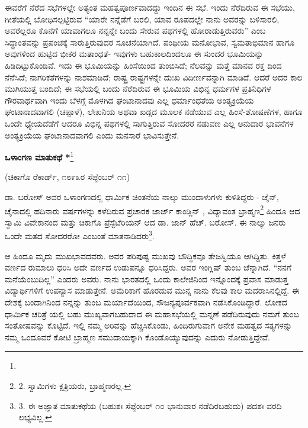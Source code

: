 ಈವರೆಗೆ ನೆರೆದ ಸಭೆಗಳಲ್ಲೇ ಅತ್ಯಂತ ಮಹತ್ವಪೂರ್ಣವಾದದ್ದು ಇಂದಿನ ಈ ಸಭೆ. ಇಂದು ನೆರೆದಿರುವ ಈ ಸಭೆಯು, ಗೀತೆಯಲ್ಲಿ ಬೋಧಿಸಲ್ಪಟ್ಟಿರುವ “ಯಾರೇ ನನ್ನೆಡೆಗೆ ಬರಲಿ, ಯಾವ ರೂಪದಲ್ಲೇ ನಾನು ಅವರನ್ನು ಬಳಿಸಾರಲಿ, ಅವರೆಲ್ಲರೂ ಕೊನೆಗೆ ಯಾವಾಗಲೂ ನನ್ನನ್ನೇ ಬಂದು ಸೇರುವ ಪಥಗಳಲ್ಲಿ ಹೋರಾಡುತ್ತಿರುವರು” ಎಂಬ ಸಿದ್ಧಾಂತವನ್ನು ಪ್ರಪಂಚಕ್ಕೆ ಸಾರುತ್ತಿರುವುದರ ಸೂಚನೆಯಾಗಿದೆ. ಪಂಥೀಯ ಮನೋಭಾವ, ಸ್ವಮತಾಭಿಮಾನ ಹಾಗೂ ಅವುಗಳಿಂದ ಹುಟ್ಟಿದ ಭೀಕರ ಮತಾಂಧತೆ- ಇವುಗಳು ಬಹುಕಾಲದಿಂದಲೂ ಈ ಸುಂದರ ಭೂಮಿಯನ್ನು ಹಿಡಿದಿಟ್ಟುಕೊಂಡಿವೆ. ಇದು ಈ ಭೂಮಿಯನ್ನು ಹಿಂಸೆಯಿಂದ ತುಂಬಿಸಿದೆ; ನೆಲವನ್ನು ಮತ್ತೆ ಮಾನವ ರಕ್ತ ದಿಂದ ನೆನೆಸಿದೆ; ನಾಗರಿಕತೆಗಳನ್ನು ನಾಶಮಾಡಿದೆ; ರಾಷ್ಟ್ರ ರಾಷ್ಟ್ರಗಳನ್ನೇ ದುಃಖ ವಿದೀರ್ಣವನ್ನಾಗಿ ಮಾಡಿದೆ. ಆದರೆ ಅದರ ಕಾಲ ಮುಗಿಯುತ್ತ ಬಂದಿದೆ; ಈ ಸಭೆಯಲ್ಲಿ ಬಂದು ನೆರೆದಿರುವ ಈ ಭೂಮಿಯ ವಿಭಿನ್ನ ಧರ್ಮಗಳ ಪ್ರತಿನಿಧಿಗಳ ಗೌರವಾರ್ಥವಾಗಿ ಇಂದು ಬೆಳಗ್ಗೆ ಮೊಳಗಿದ ಘಂಟಾನಾದವು ಎಲ್ಲ ಧರ್ಮಾಂಧತೆಯ ಅಂತ್ಯಕ್ರಿಯೆಯ ಘಂಟಾನಾದವಾಗಲಿ (ಚಪ್ಪಾಳೆ), ಲೇಖನಿಯ ಅಥವಾ ಖಡ್ಗದ ಮೂಲಕ ನಡೆಯುವ ಎಲ್ಲ ಹಿಂಸೆ-ಶೋಷಣೆಗಳ, ಹಾಗೂ ಒಂದೇ ಧ್ಯೇಯದೆಡೆಗೆ ಆದರೂ ವಿಭಿನ್ನ ಪಥಗಳಲ್ಲಿ ಸಾಗುತ್ತಿರುವ ಸೋದರರ ನಡುವಣ ಎಲ್ಲ ಅನುದಾರ ಭಾವನೆಗಳ ಅಂತ್ಯಕ್ರಿಯೆಯ ಘಂಟಾನಾದವಾಗಲಿ ಎಂದು ಮನಸಾರೆ ಭಾವಿಸುತ್ತೇನೆ.

\begin{center}
\textbf{ಒಳಾಂಗಣ ಮಾತುಕಥೆ *}\footnote{}
\end{center}

\begin{center}
(ಚಿಕಾಗೊ ರೆಕಾರ್ಡ್, ೧೮೯೩ರ ಸೆಪ್ಟೆಂಬರ್ ೧೧)
\end{center}

ಡಾ. ಬರೋಸ್ \enginline{[Barrow's]} ಅವರ ಒಳಾಂಗಣದಲ್ಲಿ ಧಾರ್ಮಿಕ ಚಿಂತನೆಯ ನಾಲ್ಕು ಮುಂದಾಳುಗಳು ಕುಳಿತಿದ್ದರು - ಜೈನ್, ಚೈನಾದಲ್ಲಿ ಹದಿನಾರು ವರ್ಷಗಳನ್ನು ಕಳೆದಿರುವ ಪ್ರಚಾರಕ ಜಾರ್ಜ್ ಕಾಂಡ್ಲಿನ್ \enginline{[Candline]}, ವಿದ್ಯಾವಂತ ಬ್ರಾಹ್ಮಣ\footnote{2. ಸ್ವಾಮಿಗಳು ಕ್ಷತ್ರಿಯರು, ಬ್ರಾಹ್ಮಣರಲ್ಲ.} ಹಿಂದೂ ಆದ ಸ್ವಾಮಿ ವಿವೇಕಾನಂದ ಮತ್ತು ಚಿಕಾಗೊ ಪ್ರೆಸ್ಬೆಟೆರಿಯನ್ ಆದ ಡಾ. ಜಾನ್ ಹೆಚ್. ಬರೋಸ್. ಈ ನಾಲ್ಕು ಜನರು ಒಂದೇ ಮತದ ಸೋದರರೋ ಎಂಬಂತೆ ಮಾತನಾಡಿದರು\footnote{3. ಈ ಅಜ್ಞಾತ ಮಾತುಕಥೆಯ (ಬಹುಶಃ ಸೆಪ್ಟೆಂಬರ್ ೧೦ ಭಾನುವಾರ ನಡೆದಿರಬಹುದು) ಪದಶಃ ವರದಿ ಲಭ್ಯವಿಲ್ಲ.}.

ಆ ಹಿಂದೂ ಮೃದು ಮುಖಭಾವದವರು. ಅವರ ಪರಿಪುಷ್ಟ ಮುಖವು ಬೌದ್ಧಿಕವೂ ತೇಜಸ್ವಿಯೂ ಆಗಿದ್ದಿತು. ಕಿತ್ತಳೆ ವರ್ಣದ ರುಮಾಲು ಧರಿಸಿ ಅದೇ ವರ್ಣದ ಉಡುಪನ್ನೂ ಧರಿಸಿದ್ದರು. ಅವರ ಇಂಗ್ಲಿಷ್ ತುಂಬ ಚೆನ್ನಾಗಿದೆ. “ನನಗೆ ಮನೆಯೆಂಬುದಿಲ್ಲ” ಎಂದರು ಅವರು. ನಾನು ಭಾರತದಲ್ಲಿ ಒಂದು ಕಾಲೇಜಿನಿಂದ ಇನ್ನೊಂದಕ್ಕೆ ಪ್ರವಾಸ ಮಾಡುತ್ತ ವಿದ್ಯಾರ್ಥಿಗಳಿಗೆ ಉಪನ್ಯಾಸ ಮಾಡುತ್ತೇನೆ. ಅಮೆರಿಕಾಗೆ ಹೊರಡುವ ಮುನ್ನ ನಾನು ಕೆಲವು ಕಾಲ ಮದರಾಸಿನಲ್ಲಿದ್ದೆ. ಈ ದೇಶಕ್ಕೆ ಬಂದಾಗಿನಿಂದ ನನ್ನನ್ನು ತುಂಬ ಮರ್ಯಾದೆಯಿಂದ, ಸೌಜನ್ಯಪೂರ್ವಕವಾಗಿ ನಡೆಸಿಕೊಂಡಿದ್ದಾರೆ. ಲೋಕದ ಧಾರ್ಮಿಕ ಚರಿತ್ರೆ ಯಲ್ಲಿ ಬಹು ಮುಖ್ಯವಾಗಬಹುದಾದ ಈ ಮಹಾಸಭೆಯಲ್ಲಿ ಮನ್ನಣೆ ಪಡೆದಿರುವುದು ನಮಗೆ ತುಂಬ ಸಂತೋಷವನ್ನು ಕೊಟ್ಟಿದೆ. ಇಲ್ಲಿ ನಮ್ಮ ಅರಿವನ್ನು ಹೆಚ್ಚಿಸಿಕೊಂಡು, ಹಿಂದಿರುಗುವಾಗ ಅನೇಕ ಮಹತ್ವದ ಸತ್ಯಗಳನ್ನು ನಮ್ಮ ಒಂದೂವರೆ ಕೋಟಿ ಬ್ರಾಹ್ಮಣ ಸಮುದಾಯಕ್ಕಾಗಿ ಕೊಂಡೊಯ್ಯುವುದನ್ನು ಎದುರು ನೋಡುತ್ತಿದ್ದೇವೆ.

